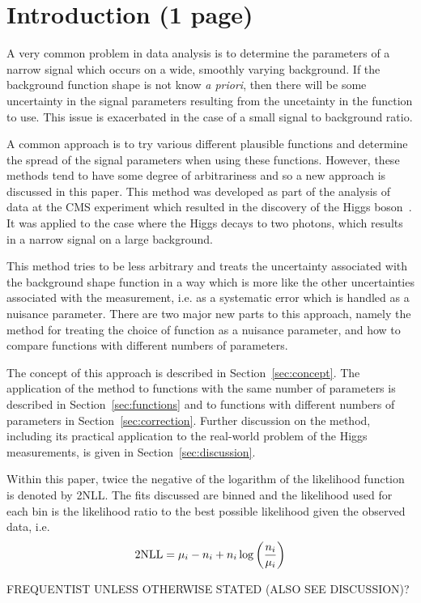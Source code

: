 \section{Introduction (1 page)}
\label{sec:introduction}

A very common problem in data analysis is to determine the parameters of
a narrow signal which occurs on a wide, smoothly varying background. If the
background function shape is not know {\it a priori}, then there will be 
some uncertainty in the signal parameters resulting from the uncetainty in
the function to use. This issue is exacerbated in the case of a small signal to
background ratio.

A common approach is to try various different plausible functions and 
determine the spread of the signal parameters when using these functions.
However, these methods tend to have some degree of arbitrariness and so
a new approach is discussed in this paper.
This method was developed as part of the analysis of data at the CMS experiment
which resulted in the discovery of the Higgs
boson~\cite{ref:introduction:higgs}.
It was applied to the case where the Higgs decays to two photons, which
results in a narrow signal on a large background.

This method tries to be less 
arbitrary and treats the uncertainty associated with the
background shape function in a way
which is more like the other
uncertainties associated with the measurement, i.e. as a systematic error
which is handled as a nuisance parameter.
There are two major new parts to this approach, namely the method for
treating the choice of function as a nuisance parameter, and how to compare 
functions with different numbers of parameters.


The concept of this approach is described in Section~\ref{sec:concept}.
The application of the method to functions with the same number of parameters
is described in Section~\ref{sec:functions} and to functions with different
numbers of parameters in Section~\ref{sec:correction}. Further discussion on
the method, including its practical application to the real-world problem of
the Higgs measurements, is given in Section~\ref{sec:discussion}.

Within this paper, twice the negative of the logarithm of the likelihood
function is denoted by 2NLL. The fits discussed are binned and the 
likelihood used for each bin is the likelihood ratio to the best
possible likelihood given the observed data, i.e.
\begin{equation}
{\rm 2NLL} = \mu_i - n_i + n_i \log\left(\frac{n_i}{\mu_i}\right)
\label{eqn:introduction:def2NLL}
\end{equation}

FREQUENTIST UNLESS OTHERWISE STATED (ALSO SEE DISCUSSION)?
